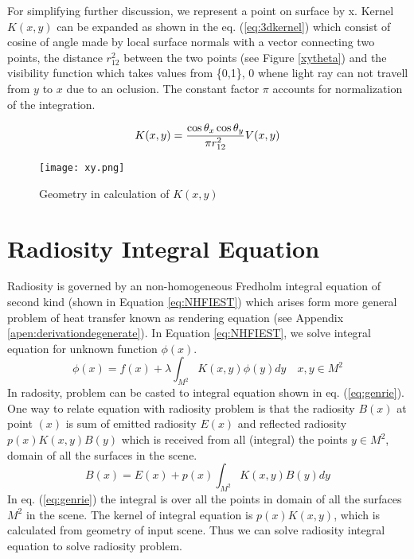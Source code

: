 For simplifying further discussion, we represent a point on surface by x. Kernel $K(x,y)$ can be expanded as shown in the eq. (\ref{eq:3dkernel}) which consist of cosine of angle made by local surface normals with a vector connecting two points, the distance  $r_{12}^{2}$ between the two points (see Figure \ref{xytheta}) and the visibility function which takes values from \{0,1\}, $0$ whene light ray can not travell from $y$ to $x$ due to an oclusion. The constant factor $\pi$ accounts for normalization of the integration. 

\begin{equation} \label{eq:3dkernel}
K(x,y) =  \frac{\cos \theta_x \cos \theta_y} {\pi r_{12}^{2}} V(x,y) \\ 
\end{equation}


\begin{figure}[h]
\centering
\texttt{[image: xy.png]}
\caption{Geometry in calculation of $K(x,y)$}
\label{fig:xytheta}
\end{figure}

\section {Radiosity Integral Equation}
Radiosity is governed by an non-homogeneous Fredholm integral equation of second kind (shown in Equation \ref{eq:NHFIEST}) which arises form more general problem of heat transfer known as rendering equation \cite{Kajiya} (see Appendix \ref{apen:derivationdegenerate}). In Equation \ref{eq:NHFIEST}, we solve integral equation for unknown function $\phi(x)$. 
\begin{equation} \label{eq:NHFIEST}
\phi(x)=f(x)+\lambda\int_{M^2} K(x,y)\phi(y)dy\quad x,y \in M^2
\end{equation}
In radosity, problem can be casted to integral equation shown in eq. (\ref{eq:genrie}). One way to relate equation with radiosity problem is that the radiosity $B(x)$ at point $(x)$  is sum of emitted radiosity $E(x)$ and reflected radiosity $p(x)K(x,y)B(y)$ which is received from all (integral) the points $y \in M^2$,  domain of all the surfaces in the scene.\\

\begin{equation} \label{eq:genrie}
B(x)=E(x)+p(x)\int_{M^2}K(x,y)B(y)dy
\end{equation}
In eq. (\ref{eq:genrie}) the integral is over all the points in domain of all  the surfaces $M^2$ in the scene. The kernel of integral equation is $p(x)K(x,y)$, which is calculated from geometry of input scene. Thus we can solve radiosity integral equation to solve radiosity problem.


